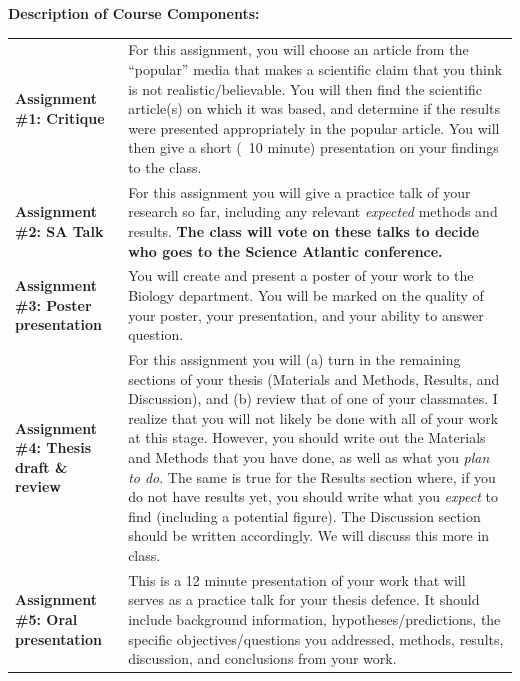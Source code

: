 \documentclass[hidelinks]{article}
\begin{document}
	\textbf{Description of Course Components:}
		\begin{table}[H]
			\begin{tabular}{@{} p{2.8cm} p{13.4cm}}
				\textbf{Assignment \#1: Critique} & For this assignment, you will choose an article from the ``popular'' media that makes a scientific claim that you think is not realistic/believable. You will then find the scientific article(s) on which it was based, and determine if the results were presented appropriately in the popular article. You will then give a short (~10 minute) presentation on your findings to the class.\\
				\addlinespace
				\textbf{Assignment \#2: SA Talk} & For this assignment you will give a practice talk of your research so far, including any relevant \emph{expected} methods and results. \textbf{The class will vote on these talks to decide who goes to the Science Atlantic conference.}\\
				\addlinespace
				\textbf{Assignment \#3: Poster presentation} & You will create and present a poster of your work to the Biology department. You will be marked on the quality of your poster, your presentation, and your ability to answer question.\\
				\addlinespace
				\textbf{Assignment \#4: Thesis draft \& review} & For this assignment you will (a) turn in the remaining sections of your thesis (Materials and Methods, Results, and Discussion), and (b) review that of one of your classmates. I realize that you will not likely be done with all of your work at this stage. However, you should write out the Materials and Methods that you have done, as well as what you \emph{plan to do}. The same is true for the Results section where, if you do not have results yet, you should write what you \emph{expect} to find (including a potential figure). The Discussion section should be written accordingly. We will discuss this more in class.\\
				\addlinespace
				 \textbf{Assignment \#5: Oral presentation} & This is a 12 minute presentation of your work that will serves as a practice talk for your thesis defence. It should include background information, hypotheses/predictions, the specific objectives/questions you addressed, methods, results, discussion, and conclusions from your work.\\
			\end{tabular}
		\end{table}
\end{document}
